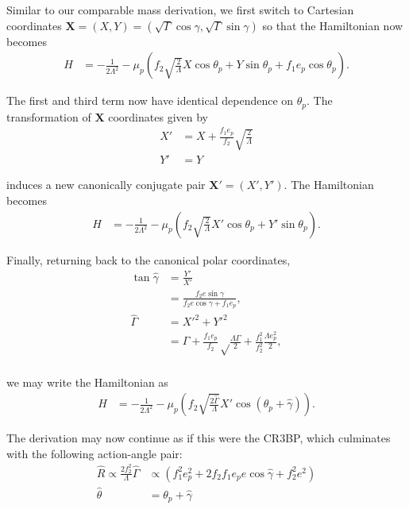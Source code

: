 \documentclass[usenatbib,twocolumn]{mnras}
\begin{document}
Similar to our comparable mass derivation,
we first switch to Cartesian coordinates
\(\mathbf X = (X,Y) = (\sqrt{\Gamma}\cos\gamma, \sqrt{\Gamma}\sin\gamma)\)
so that the Hamiltonian now becomes
\begin{align}
  H
  &= - \frac{1}{2\Lambda^2} - \mu_p\left(f_2
    \sqrt{\frac{2}{\Lambda}}X\cos\theta_p + Y\sin\theta_p + f_1 e_p\cos\theta_p\right).
\end{align}

\noindent The first and third term now have identical dependence on
\(\theta_p\).  The transformation of
\(\mathbf X\) coordinates given by
\begin{align}
  X' &= X + \frac{f_1e_p}{f_2}\sqrt{\frac{2}{\Lambda}} \\
  Y' &= Y
\end{align}

\noindent
induces a new canonically conjugate pair \(\mathbf X'=(X',Y')\).
The Hamiltonian becomes
\begin{align}
  H
  &= - \frac{1}{2\Lambda^2} - \mu_p\left(f_2
    \sqrt{\frac{2}{\Lambda}}X'\cos\theta_p + Y'\sin\theta_p \right).
\end{align}

\noindent
Finally, returning back to the canonical polar coordinates,
\begin{align}
  \tan\hat\gamma
  &= \frac{Y'}{X'} \\
  &= \frac{f_2e\sin\gamma}{f_2e\cos\gamma + f_1e_p},\label{eq:hatgtp}\\
  \hat\Gamma
  &= X'^2 + Y'^2 \\
  &= \Gamma + \frac{f_1e_p}{f_2}\sqrt\frac{\Lambda\Gamma}{2}
    + \frac{f_1^2}{f_2^2}\frac{\Lambda e_p^2}{2},\label{eq:hatGtp}\\
\end{align}

\noindent
we may write the Hamiltonian as
\begin{align}
  H
  &= - \frac{1}{2\Lambda^2} - \mu_p\left(f_2
    \sqrt{\frac{2\hat\Gamma}{\Lambda}}X'\cos(\theta_p+\hat\gamma) \right).
\end{align}

\noindent
The derivation may now continue as if this were the CR3BP,
which culminates with the following action-angle pair:
\begin{align}
\hat R \propto
\frac{2f_2^2}{\Lambda}\hat\Gamma
  &\propto(f_1^2 e_p^2 + 2 f_2 f_1 e_pe\cos\hat\gamma + f_2^2 e^2 ) \\
\hat\theta
  &= \theta_p + \hat\gamma
\end{align}
\end{document}
